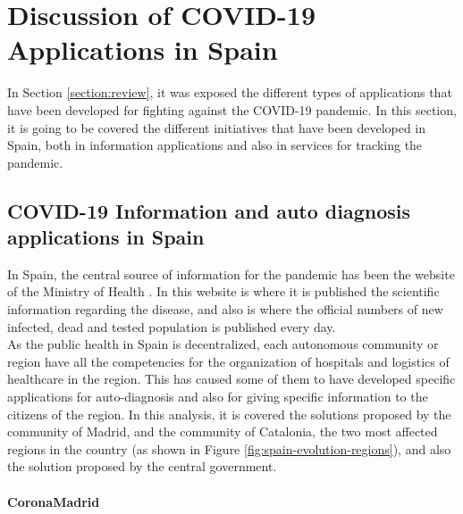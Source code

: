 \documentclass[a4paper, 12pt]{article}
\begin{document}

\section{Discussion of COVID-19 Applications in Spain}
\label{section:discussion}

In Section \ref{section:review}, it was exposed the different types of applications that have been developed for fighting against the COVID-19 pandemic. In this section, it is going to be covered the different initiatives that have been developed in Spain, both in information applications and also in services for tracking the pandemic.

\subsection{COVID-19 Information and auto diagnosis applications in Spain}
\label{sec:information-apps-spain}

In Spain, the central source of information for the pandemic has been the website of the Ministry of Health \cite{ministerio-sanidad}. In this website is where it is published the scientific information regarding the disease, and also is where the official numbers of new infected, dead and tested population is published every day.\\

As the public health in Spain is decentralized, each autonomous community or region have all the competencies for the organization of hospitals and logistics of healthcare in the region. This has caused some of them to have developed specific applications for auto-diagnosis and also for giving specific information to the citizens of the region. In this analysis, it is covered the solutions proposed by the community of Madrid, and the community of Catalonia, the two most affected regions in the country (as shown in Figure \ref{fig:spain-evolution-regions}), and also the solution proposed by the central government.

\paragraph{CoronaMadrid} \mbox{}\\
\end{document}
